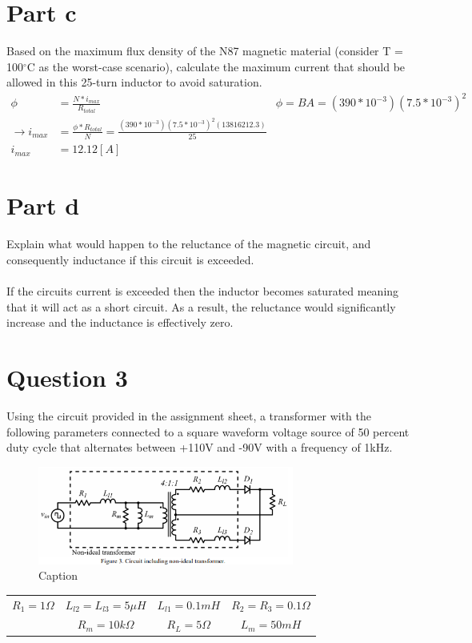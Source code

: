 \documentclass{article}
\begin{document}
\section*{Part c}
Based on the maximum flux density of the N87 magnetic material (consider T = 100$^{\circ}$C as the worst-case scenario), calculate the maximum current that should be allowed in this 25-turn inductor to avoid saturation.
\begin{align*}
    \phi &= \frac{N*i_{max}}{R_{total}}& \phi = BA = (390*10^{-3})(7.5*10^{-3})^2 \\
    \rightarrow i_{max}& = \frac{\phi * R_{total}}{N} = \frac{(390*10^{-3})(7.5*10^{-3})^2(13816212.3)}{25} \\
    i_{max} &= 12.12[A]
\end{align*}

\section*{Part d}
Explain what would happen to the reluctance of the magnetic circuit, and consequently inductance if this circuit is exceeded.\\
\\ If the circuits current is exceeded then the inductor becomes saturated meaning that it will act as a short circuit. As a result, the reluctance would significantly increase and the inductance is effectively zero.

\section{Question 3}
Using the circuit provided in the assignment sheet, a transformer with the following parameters connected to a square waveform voltage source of 50 percent duty cycle that alternates between +110V and -90V with a frequency of 1kHz.
\begin{figure}[H]
    \centering
    \includegraphics[width=0.75\textwidth]{Q3.png}
    \caption{Caption}
\end{figure}

\begin{center}
\begin{tabular}{ c c c c}
    $R_1 = 1 \Omega $ & $L_{l2} = L_{l3} = 5 \mu H$ & $L_{l1} = 0.1 mH$ & $R_2 = R_3 = 0.1 \Omega$ \\ & $R_m = 10k \Omega$ & $R_L = 5 \Omega$ & $L_m = 50mH$
\end{tabular}
\end{center}
\end{document}
